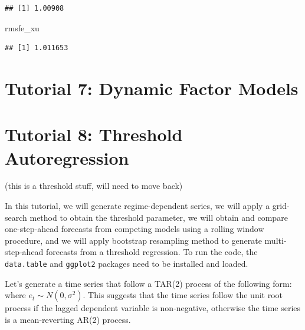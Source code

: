 \documentclass[
  12pt,
  oneside]{book}
\newenvironment{Shaded}{\begin{snugshade}}{\end{snugshade}}
\newcommand{\NormalTok}[1]{#1}
\begin{document}
\begin{verbatim}
## [1] 1.00908
\end{verbatim}

\begin{Shaded}
\begin{Highlighting}[]
\NormalTok{rmsfe\_xu}
\end{Highlighting}
\end{Shaded}

\begin{verbatim}
## [1] 1.011653
\end{verbatim}

\hypertarget{tutorial-7-dynamic-factor-models}{%
\chapter*{Tutorial 7: Dynamic Factor Models}\label{tutorial-7-dynamic-factor-models}}

\hypertarget{tutorial-8-threshold-autoregression}{%
\chapter*{Tutorial 8: Threshold Autoregression}\label{tutorial-8-threshold-autoregression}}

(this is a threshold stuff, will need to move back)

In this tutorial, we will generate regime-dependent series, we will apply a grid-search method to obtain the threshold parameter, we will obtain and compare one-step-ahead forecasts from competing models using a rolling window procedure, and we will apply bootstrap resampling method to generate multi-step-ahead forecasts from a threshold regression. To run the code, the \texttt{data.table} and \texttt{ggplot2} packages need to be installed and loaded.

Let's generate a time series that follow a TAR(2) process of the following form:
where \(e_{t} \sim N(0,\sigma^2)\). This suggests that the time series follow the unit root process if the lagged dependent variable is non-negative, otherwise the time series is a mean-reverting AR(2) process.
\end{document}
